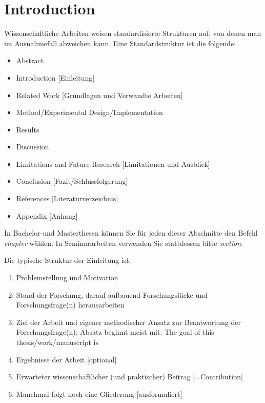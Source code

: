 \chapter{Introduction} \label{chap:introduction}

Wissenschaftliche Arbeiten weisen standardisierte Strukturen auf, von denen man im Ausnahmefall abweichen kann. Eine Standardstruktur ist die folgende:
\begin{itemize}
  \item Abstract
  \item Introduction [Einleitung]
  \item Related Work [Grundlagen und Verwandte Arbeiten]
  \item Method/Experimental Design/Implementation
  \item Results
  \item Discussion
  \item Limitations and Future Research [Limitationen und Ausblick]
  \item Conclusion [Fazit/Schlussfolgerung]
  \item References [Literaturverzeichnis]
  \item Appendix [Anhang]
\end{itemize}

In Bachelor-und Masterthesen können Sie für jeden dieser Abschnitte den Befehl \emph{chapter} wählen. In Seminararbeiten verwenden Sie stattdessen bitte \emph{section}.

Die typische Struktur der Einleitung ist:
\begin{enumerate}
  \item Problemstellung und Motivation
  \item Stand der Forschung, darauf aufbauend Forschungslücke und Forschungsfrage(n) herausarbeiten
  \item Ziel der Arbeit und eigener methodischer Ansatz zur Beantwortung der Forschungsfrage(n): Absatz beginnt meist mit: The goal of this thesis/work/manuscript is
  \item Ergebnisse der Arbeit [optional]
  \item Erwarteter wissenschaftlicher (und praktischer) Beitrag [=Contribution]
  \item Manchmal folgt noch eine Gliederung [ausformuliert]
\end{enumerate}
